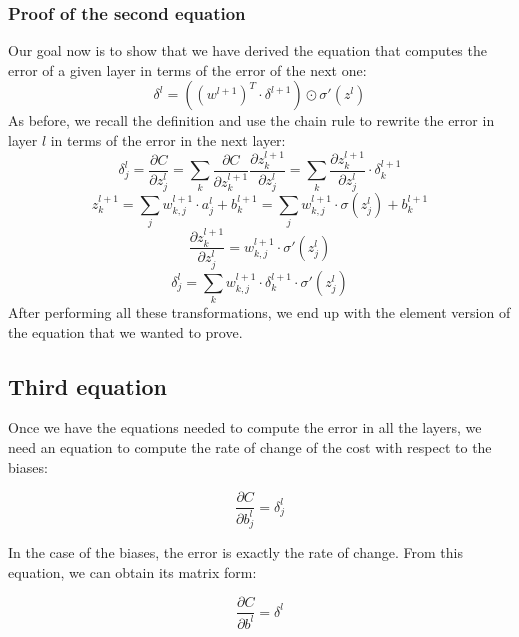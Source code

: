 \documentclass[../main]{subfiles}
\begin{document}
\subsubsection{Proof of the second equation}
Our goal now is to show that we have derived the equation that computes the error of a given layer in terms of the error of the next one:
\begin{equation*}
    \delta^l = \left((w^{l+1})^T \cdot \delta^{l+1}\right) \odot \sigma'(z^l)
\end{equation*}
As before, we recall the definition and use the chain rule to rewrite the error in layer \(l\) in terms of the error in the next layer:
\begin{equation*}
    \delta_{j}^l = \frac{\partial C}{\partial z_{j}^l} = \sum_k \frac{\partial C}{\partial z_{k}^{l+1}} \frac{\partial z_{k}^{l+1}}{\partial z_{j}^l} = \sum_k \frac{\partial z_{k}^{l+1}}{\partial z_{j}^l} \cdot \delta_{k}^{l+1}
\end{equation*}
\begin{equation*}
    z_{k}^{l+1} = \sum_j w_{k,j}^{l+1} \cdot a_{j}^{l} + b_{k}^{l+1} = \sum_j w_{k,j}^{l+1} \cdot \sigma(z_{j}^{l}) + b_{k}^{l+1}
\end{equation*}
\begin{equation*}
    \frac{\partial z_{k}^{l+1}}{\partial z_{j}^l} = w_{k,j}^{l+1} \cdot \sigma'(z_{j}^{l})
\end{equation*}
\begin{equation*}
    \delta_{j}^l = \sum_k w_{k,j}^{l+1} \cdot \delta_{k}^{l+1} \cdot \sigma'(z_{j}^{l})
\end{equation*}
After performing all these transformations, we end up with the element version of the equation that we wanted to prove.
\subsection{Third equation}
Once we have the equations needed to compute the error in all the layers, we need an equation to compute the rate of change of the cost with respect to the biases:\\
\begin{mdframed}[style=myequationstyle]
\begin{equation*}
    \frac{\partial C}{\partial b_{j}^l} = \delta_{j}^l
\end{equation*}
\end{mdframed}\vspace{4mm}
In the case of the biases, the error is exactly the rate of change. From this equation, we can obtain its matrix form:\vspace{6mm}
\begin{mdframed}[style=myequationstyle]
\begin{equation*}
    \frac{\partial C}{\partial b^l} = \delta^l
\end{equation*}
\end{mdframed}
\end{document}
